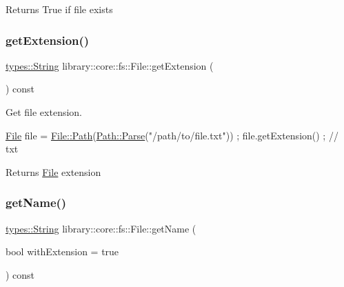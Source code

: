 \begin{DoxyReturn}{Returns}
True if file exists 
\end{DoxyReturn}
\mbox{\label{classlibrary_1_1core_1_1fs_1_1_file_a157085065abfb37e58a1d5ea44eb96e8}} 
\subsubsection{\texorpdfstring{get\+Extension()}{getExtension()}}
{\footnotesize\ttfamily \hyperlink{classlibrary_1_1core_1_1types_1_1_string}{types\+::\+String} library\+::core\+::fs\+::\+File\+::get\+Extension (\begin{DoxyParamCaption}{ }\end{DoxyParamCaption}) const}



Get file extension. 


\begin{DoxyCode}
\hyperlink{classlibrary_1_1core_1_1fs_1_1_file_a7490060f19a21d4ee58bb6cec87a1ca6}{File} file = \hyperlink{classlibrary_1_1core_1_1fs_1_1_file_a0e0d8a8becb3cdd21775554e181452d8}{File::Path}(\hyperlink{classlibrary_1_1core_1_1fs_1_1_path_aebf5bd3af83e0b7376616e146f3e55df}{Path::Parse}(\textcolor{stringliteral}{"/path/to/file.txt"})) ;
file.getExtension() ; \textcolor{comment}{// txt}
\end{DoxyCode}


\begin{DoxyReturn}{Returns}
\hyperlink{classlibrary_1_1core_1_1fs_1_1_file}{File} extension 
\end{DoxyReturn}
\mbox{\label{classlibrary_1_1core_1_1fs_1_1_file_affd399abd971505b424d7ced3d43c61d}} 
\subsubsection{\texorpdfstring{get\+Name()}{getName()}}
{\footnotesize\ttfamily \hyperlink{classlibrary_1_1core_1_1types_1_1_string}{types\+::\+String} library\+::core\+::fs\+::\+File\+::get\+Name (\begin{DoxyParamCaption}\item[{bool}]{with\+Extension = {\ttfamily true} }\end{DoxyParamCaption}) const}



